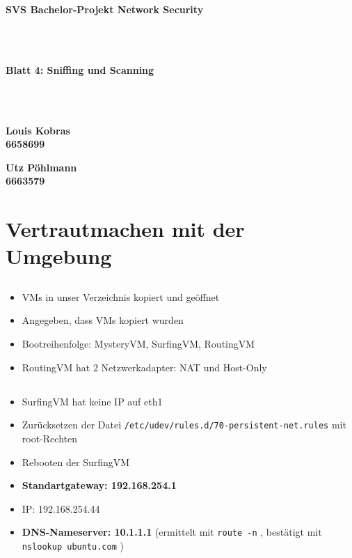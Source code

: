 \documentclass[twoside]{article}
\newcommand{\ttt}[1]{%
	\texttt{#1}%
}
\begin{document}
\pagestyle{fancy}
\fancyhead{}
\fancyfoot{}

\begin{center}
\begin{Huge}
\textbf{SVS Bachelor-Projekt Network Security}
\end{Huge}\\\-\\
\begin{Large}
\textbf{Blatt 4: Sniffing und Scanning}
\end{Large}\\\-\\
\begin{minipage}[t]{0.48\textwidth}
\begin{center}\textbf{
	Louis Kobras\\
	6658699}
\end{center}
\end{minipage}
\begin{minipage}[t]{0.48\textwidth}
\begin{center}\textbf{
	Utz Pöhlmann\\
	6663579}
\end{center}
\end{minipage}
\end{center}

\section{Vertrautmachen mit der Umgebung}
\subsection{}
\begin{itemize}
	\item VMs in unser Verzeichnis kopiert und geöffnet
	\item Angegeben, dass VMs kopiert wurden
	\item Bootreihenfolge: MysteryVM, SurfingVM, RoutingVM
	\item RoutingVM hat 2 Netzwerkadapter: NAT und Host-Only
\end{itemize}
\subsection{}
\begin{itemize}
	\item SurfingVM hat keine IP auf eth1
	\item Zurücksetzen der Datei \ttt{/etc/udev/rules.d/70-persistent-net.rules} mit root-Rechten
	\item Rebooten der SurfingVM
	\item \textbf{Standartgateway: 192.168.254.1}
	\item IP: 192.168.254.44
	\item \textbf{DNS-Nameserver: 10.1.1.1} (ermittelt mit \ttt{route -n}, bestätigt mit \ttt{nslookup ubuntu.com})
\end{itemize}
\end{document}
